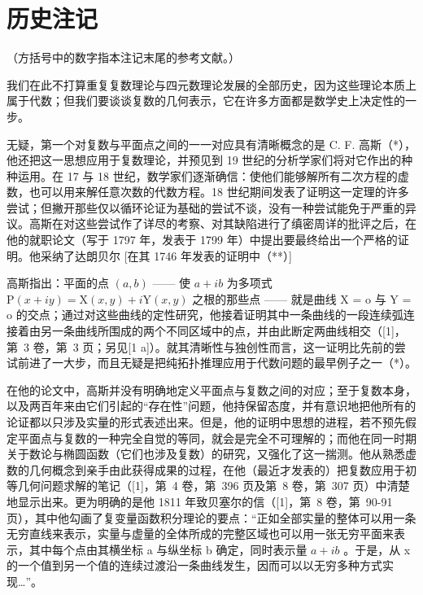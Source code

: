 \section*{历史注记}
{}

（方括号中的数字指本注记末尾的参考文献。）

我们在此不打算重复复数理论与四元数理论发展的全部历史，因为这些理论本质上属于代数；但我们要谈谈复数的几何表示，它在许多方面都是数学史上决定性的一步。

无疑，第一个对复数与平面点之间的一一对应具有清晰概念的是 C. F. 高斯（*），他还把这一思想应用于复数理论，并预见到 19 世纪的分析学家们将对它作出的种种运用。在 17 与 18 世纪，数学家们逐渐确信：使他们能够解所有二次方程的虚数，也可以用来解任意次数的代数方程。18 世纪期间发表了证明这一定理的许多尝试；但撇开那些仅以循环论证为基础的尝试不谈，没有一种尝试能免于严重的异议。高斯在对这些尝试作了详尽的考察、对其缺陷进行了缜密周详的批评之后，在他的就职论文（写于 1797 年，发表于 1799 年）中提出要最终给出一个严格的证明。他采纳了达朗贝尔 {[}在其 1746 年发表的证明中（**）{]}

高斯指出：平面的点 \((a, b)\) —— 使 \(a + ib\) 为多项式 \(\mathrm{P}(x + iy) = \mathrm{X}(x, y) + i\mathrm{Y}(x, y)\) 之根的那些点 —— 就是曲线 X = o 与 Y = o 的交点；通过对这些曲线的定性研究，他接着证明其中一条曲线的一段连续弧连接着由另一条曲线所围成的两个不同区域中的点，并由此断定两曲线相交（{[}1{]}，第~3 卷，第~3 页；另见{[}1 a{]}）。就其清晰性与独创性而言，这一证明比先前的尝试前进了一大步，而且无疑是把纯拓扑推理应用于代数问题的最早例子之一（*）。

在他的论文中，高斯并没有明确地定义平面点与复数之间的对应；至于复数本身，以及两百年来由它们引起的“存在性”问题，他持保留态度，并有意识地把他所有的论证都以只涉及实量的形式表述出来。但是，他的证明中思想的进程，若不预先假定平面点与复数的一种完全自觉的等同，就会是完全不可理解的；而他在同一时期关于数论与椭圆函数（它们也涉及复数）的研究，又强化了这一揣测。他从熟悉虚数的几何概念到亲手由此获得成果的过程，在他（最近才发表的）把复数应用于初等几何问题求解的笔记（{[}1{]}，第~4 卷，第~396 页及第~8 卷，第~307 页）中清楚地显示出来。更为明确的是他 1811 年致贝塞尔的信（{[}1{]}，第~8 卷，第~90-91 页），其中他勾画了复变量函数积分理论的要点：“正如全部实量的整体可以用一条无穷直线来表示，实量与虚量的全体所成的完整区域也可以用一张无穷平面来表示，其中每个点由其横坐标 a 与纵坐标 b 确定，同时表示量 \(a + ib\) 。于是，从 x 的一个值到另一个值的连续过渡沿一条曲线发生，因而可以以无穷多种方式实现\ldots”。

